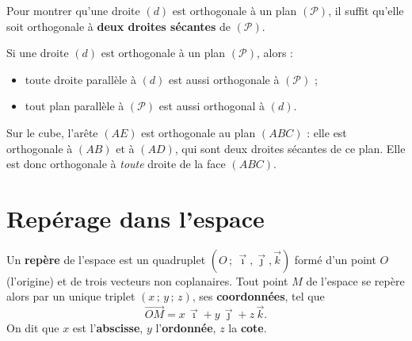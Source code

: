 \begin{theoreme}
Pour montrer qu'une droite $(d)$ est orthogonale à un plan $(\mathcal{P})$, il suffit
qu'elle soit orthogonale à \textbf{deux droites sécantes} de $(\mathcal{P})$.
\end{theoreme}

\begin{propriete}
Si une droite $(d)$ est orthogonale à un plan $(\mathcal{P})$, alors :
\begin{itemize}
  \item toute droite parallèle à $(d)$ est aussi orthogonale à $(\mathcal{P})$ ;
  \item tout plan parallèle à $(\mathcal{P})$ est aussi orthogonal à $(d)$.
\end{itemize}
\end{propriete}

\begin{exemple}
Sur le cube, l'arête $(AE)$ est orthogonale au plan $(ABC)$ : elle est orthogonale à
$(AB)$ et à $(AD)$, qui sont deux droites sécantes de ce plan. Elle est donc
orthogonale à \emph{toute} droite de la face $(ABC)$.
\end{exemple}

\section{Repérage dans l'espace}

\begin{definition}
Un \textbf{repère} de l'espace est un quadruplet $(O\,;\,\vec{\imath},\vec{\jmath},
\vec{k})$ formé d'un point $O$ (l'origine) et de trois vecteurs non coplanaires.
Tout point $M$ de l'espace se repère alors par un unique triplet $(x\,;\,y\,;\,z)$,
ses \textbf{coordonnées}, tel que
\[ \overrightarrow{OM}=x\,\vec{\imath}+y\,\vec{\jmath}+z\,\vec{k}. \]
On dit que $x$ est l'\textbf{abscisse}, $y$ l'\textbf{ordonnée}, $z$ la \textbf{cote}.
\end{definition}

\begin{illus}
\end{illus}

